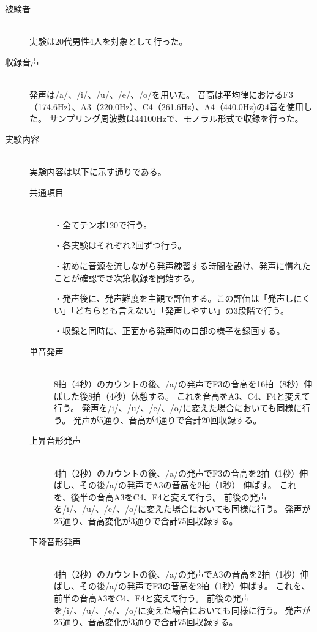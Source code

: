 \documentclass[10.5ptj,a4j,dvipdfmx,uplatex, oneside, openany, report]{jsbook}%
\begin{document}
\begin{description}
    \item[被験者]\mbox{}\\
        実験は20代男性4人を対象として行った。
    \item[収録音声]\mbox{}\\
        発声は/a/、/i/、/u/、/e/、/o/を用いた。
        音高は平均律におけるF3（174.6Hz）、A3（220.0Hz）、C4（261.6Hz）、A4（440.0Hz)の4音を使用した。
        サンプリング周波数は44100Hzで、モノラル形式で収録を行った。
    \item[実験内容]\mbox{}\\
        実験内容は以下に示す通りである。
        \begin{description}
            \item[共通項目]\mbox{}\\
                ・全てテンポ120で行う。
                
                ・各実験はそれぞれ2回ずつ行う。
                
                ・初めに音源を流しながら発声練習する時間を設け、発声に慣れたことが確認でき次第収録を開始する。

                ・発声後に、発声難度を主観で評価する。この評価は「発声しにくい」「どちらとも言えない」「発声しやすい」の3段階で行う。
                
                ・収録と同時に、正面から発声時の口部の様子を録画する。
            \item[単音発声]\mbox{}\\
                8拍（4秒）のカウントの後、/a/の発声でF3の音高を16拍（8秒）伸ばした後8拍（4秒）休憩する。
                これを音高をA3、C4、F4と変えて行う。
                発声を/i/、/u/、/e/、/o/に変えた場合においても同様に行う。
                発声が5通り、音高が4通りで合計20回収録する。
            \item[上昇音形発声]\mbox{}\\
                4拍（2秒）のカウントの後、/a/の発声でF3の音高を2拍（1秒）伸ばし、その後/a/の発声でA3の音高を2拍（1秒）
                伸ばす。
                これを、後半の音高A3をC4、F4と変えて行う。
                前後の発声を/i/、/u/、/e/、/o/に変えた場合においても同様に行う。
                発声が25通り、音高変化が3通りで合計75回収録する。
            \item[下降音形発声]\mbox{}\\
                4拍（2秒）のカウントの後、/a/の発声でA3の音高を2拍（1秒）伸ばし、その後/a/の発声でF3の音高を2拍（1秒）伸ばす。
                これを、前半の音高A3をC4、F4と変えて行う。
                前後の発声を/i/、/u/、/e/、/o/に変えた場合においても同様に行う。
                発声が25通り、音高変化が3通りで合計75回収録する。
        \end{description}


\end{description}
\end{document}

